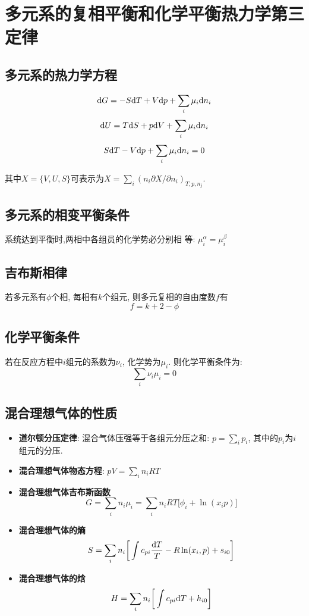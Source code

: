 \section{多元系的复相平衡和化学平衡热力学第三定律}


\subsection{多元系的热力学方程}
\[
\mathrm{d} G = -S\mathrm{d} T + V\mathrm{d} p + \sum_i\mu_i\mathrm{d} n_i 
\]
\[
\mathrm{d} U = T\mathrm{d} S + p\mathrm{d} V + \sum_i\mu_i\mathrm{d} n_i 
\]
\[
S\mathrm{d} T - V\mathrm{d} p + \sum_i\mu_i\mathrm{d} n_i = 0
\]

其中$X=\{V, U, S\}$可表示为$X= \sum_i(n_i\partial X/\partial n_i)_{T,p,n_j}$.

\subsection{多元系的相变平衡条件}
系统达到平衡时,两相中各组员的化学势必分别相
等: $\mu_i^\alpha = \mu_i^\beta$


\subsection{吉布斯相律}
若多元系有$\phi$个相, 每相有$k$个组元, 则多元复相的自由度数$f$有
\[
f = k + 2 - \phi
\]

\subsection{化学平衡条件}
若在反应方程中$i$组元的系数为$\nu_i$, 化学势为$\mu_i$. 则化学平衡条件为:
\[
\sum_i \nu_i \mu_i = 0
\]

\subsection{混合理想气体的性质}
\begin{itemize}
\item \textbf{道尔顿分压定律}: 混合气体压强等于各组元分压之和: $p=\sum_ip_i$, 其中的$p_i$为$i$组元的分压.
\item \textbf{混合理想气体物态方程}: $pV=\sum_{i}n_iRT$
\item \textbf{混合理想气体吉布斯函数}
\[
G=\sum_in_i\mu_i=\sum_in_iRT\Big[\phi_i+\ln(x_ip)\Big]
\]
\item \textbf{混合理想气体的熵}
\[
S = \sum_i n_i\bigg[\int c_{pi}\frac{\mathrm{d} T}{T}-R\ln(x_i,p) + s_{i0}\bigg]
\]
\item \textbf{混合理想气体的焓}
\[
H = \sum_i n_i\bigg[\int c_{pi}\mathrm{d} T + h_{i0}\bigg]
\]
\end{itemize}

